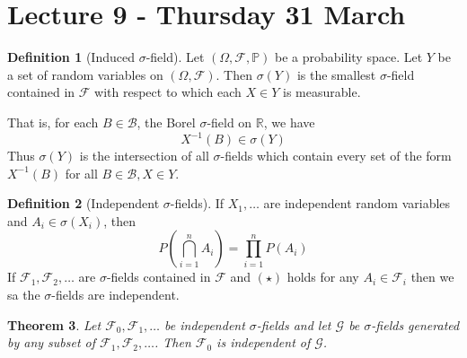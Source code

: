 \documentclass[10pt, oneside, reqno]{amsart}
\theoremstyle{plain}%
\newtheorem{thm}{Theorem}[section]
\theoremstyle{definition}
\newtheorem{defn}[thm]{Definition}
\theoremstyle{remark}
\newcommand{\sigf}{\mathcal{F}}
\newcommand{\R}{\mathbb{R}}
\renewcommand{\P}{\mathbb{P}}
\begin{document}
\section{Lecture 9 - Thursday 31 March} %
\label{sec:lecture_9_thursdy_31_march}
\begin{defn}[Induced $\sigma$-field]
	Let $(\Omega, \sigf, \P)$ be a probability space.  Let $Y$ be a set of random variables on $(\Omega, \sigf)$.  Then $\sigma(Y)$ is the smallest $\sigma$-field contained in $\sigf$ with respect to which each $X \in Y$ is measurable.  
	
	That is, for each $B \in \mathcal{B}$, the Borel $\sigma$-field on $\R$, we have \[
		X^{-1}(B) \in \sigma(Y)
	\]  Thus $\sigma(Y)$ is the intersection of all $\sigma$-fields which contain every set of the form $X^{-1}(B)$ for all $B \in \mathcal{B}, X \in Y$.  
\end{defn}

\begin{defn}[Independent $\sigma$-fields]
	If $X_1, \dots$ are independent random variables and $A_i \in \sigma(X_i)$, then \[
		P(\bigcap_{i=1}^n A_i) = \prod_{i=1}^n P(A_i) \tag{$\star$}
	\]
	If $\sigf_1, \sigf_2, \dots$ are $\sigma$-fields contained in $\sigf$ and $(\star)$ holds for any $A_i \in \sigf_i$ then we sa the $\sigma$-fields are independent. 
\end{defn}

\begin{thm}
	Let $\sigf_0, \sigf_1, \dots$ be independent $\sigma$-fields and let $\mathcal{G}$ be $\sigma$-fields generated by any subset of $\sigf_1, \sigf_2, \dots$.  Then $\sigf_0$ is independent of $\mathcal{G}$.  
\end{thm}
\end{document}
